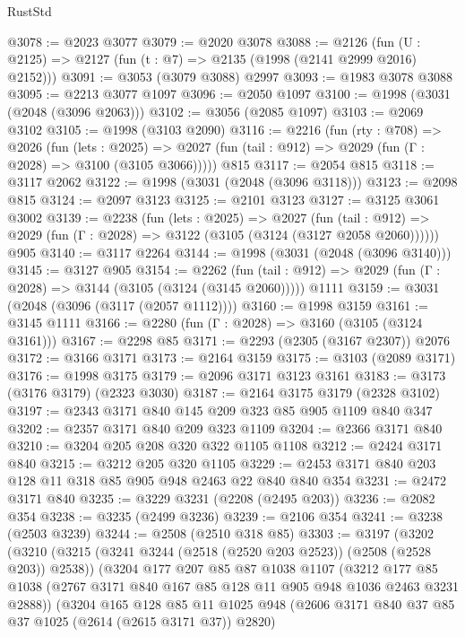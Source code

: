 \begin{lexlean}{RustStd}
\begin{coremodule}
@3078 := @2023 @3077
@3079 := @2020 @3078
@3088 := @2126 (fun (U : @2125) => @2127 (fun (t : @7) => @2135 (@1998 (@2141 @2999 @2016) @2152)))
@3091 := @3053 (@3079 @3088) @2997
@3093 := @1983 @3078 @3088
@3095 := @2213 @3077 @1097
@3096 := @2050 @1097
@3100 := @1998 (@3031 (@2048 (@3096 @2063)))
@3102 := @3056 (@2085 @1097)
@3103 := @2069 @3102
@3105 := @1998 (@3103 @2090)
@3116 := @2216
    (fun (rty : @708) =>
    @2026
      (fun (lets : @2025) =>
      @2027 (fun (tail : @912) => @2029 (fun (Γ : @2028) => @3100 (@3105 @3066)))))
    @815
@3117 := @2054 @815
@3118 := @3117 @2062
@3122 := @1998 (@3031 (@2048 (@3096 @3118)))
@3123 := @2098 @815
@3124 := @2097 @3123
@3125 := @2101 @3123
@3127 := @3125 @3061 @3002
@3139 := @2238
    (fun (lets : @2025) =>
    @2027
      (fun (tail : @912) => @2029 (fun (Γ : @2028) => @3122 (@3105 (@3124 (@3127 @2058 @2060))))))
    @905
@3140 := @3117 @2264
@3144 := @1998 (@3031 (@2048 (@3096 @3140)))
@3145 := @3127 @905
@3154 := @2262
    (fun (tail : @912) => @2029 (fun (Γ : @2028) => @3144 (@3105 (@3124 (@3145 @2060)))))
    @1111
@3159 := @3031 (@2048 (@3096 (@3117 (@2057 @1112))))
@3160 := @1998 @3159
@3161 := @3145 @1111
@3166 := @2280 (fun (Γ : @2028) => @3160 (@3105 (@3124 @3161)))
@3167 := @2298 @85
@3171 := @2293 (@2305 (@3167 @2307)) @2076
@3172 := @3166 @3171
@3173 := @2164 @3159
@3175 := @3103 (@2089 @3171)
@3176 := @1998 @3175
@3179 := @2096 @3171 @3123 @3161
@3183 := @3173 (@3176 @3179) (@2323 @3030)
@3187 := @2164 @3175 @3179 (@2328 @3102)
@3197 := @2343 @3171 @840 @145 @209 @323 @85 @905 @1109 @840 @347
@3202 := @2357 @3171 @840 @209 @323 @1109
@3204 := @2366 @3171 @840
@3210 := @3204 @205 @208 @320 @322 @1105 @1108
@3212 := @2424 @3171 @840
@3215 := @3212 @205 @320 @1105
@3229 := @2453 @3171 @840 @203 @128 @11 @318 @85 @905 @948 @2463 @22 @840 @840 @354
@3231 := @2472 @3171 @840
@3235 := @3229 @3231 (@2208 (@2495 @203))
@3236 := @2082 @354
@3238 := @3235 (@2499 @3236)
@3239 := @2106 @354
@3241 := @3238 (@2503 @3239)
@3244 := @2508 (@2510 @318 @85)
@3303 := @3197
    (@3202
      (@3210
        (@3215 (@3241 @3244 (@2518 (@2520 @203 @2523)) (@2508 (@2528 @203)) @2538))
        (@3204
          @177
          @207
          @85
          @87
          @1038
          @1107
          (@3212
            @177
            @85
            @1038
            (@2767 @3171 @840 @167 @85 @128 @11 @905 @948 @1036 @2463 @3231 @2888))
          (@3204
            @165
            @128
            @85
            @11
            @1025
            @948
            (@2606 @3171 @840 @37 @85 @37 @1025 (@2614 (@2615 @3171 @37)) @2820)

\end{coremodule}
\end{lexlean}
